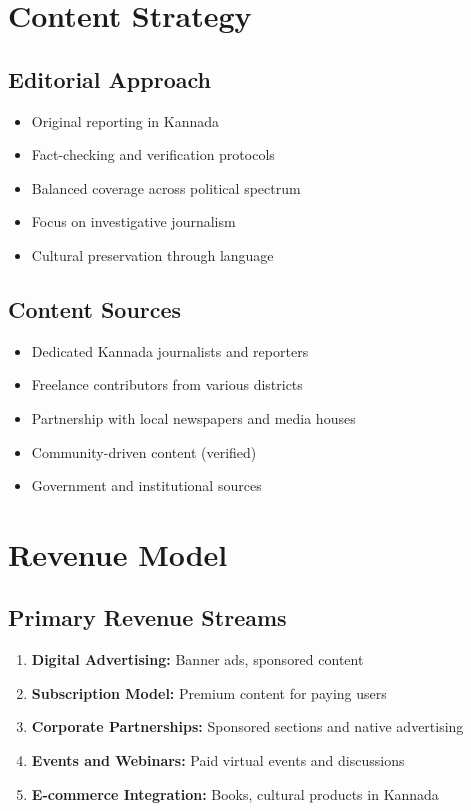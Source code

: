 \documentclass[11pt,a4paper]{article}
\begin{document}
\section{Content Strategy}

\subsection{Editorial Approach}
\begin{itemize}[leftmargin=2em]
    \item Original reporting in Kannada
    \item Fact-checking and verification protocols
    \item Balanced coverage across political spectrum
    \item Focus on investigative journalism
    \item Cultural preservation through language
\end{itemize}

\subsection{Content Sources}
\begin{itemize}[leftmargin=2em]
    \item Dedicated Kannada journalists and reporters
    \item Freelance contributors from various districts
    \item Partnership with local newspapers and media houses
    \item Community-driven content (verified)
    \item Government and institutional sources
\end{itemize}

\section{Revenue Model}

\subsection{Primary Revenue Streams}
\begin{enumerate}[leftmargin=2em]
    \item \textbf{Digital Advertising:} Banner ads, sponsored content
    \item \textbf{Subscription Model:} Premium content for paying users
    \item \textbf{Corporate Partnerships:} Sponsored sections and native advertising
    \item \textbf{Events and Webinars:} Paid virtual events and discussions
    \item \textbf{E-commerce Integration:} Books, cultural products in Kannada
\end{enumerate}
\end{document}
